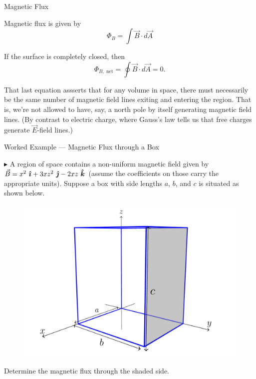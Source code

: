 \documentclass{beamer}
\begin{document}
\begin{frame}{Magnetic Flux}

Magnetic flux is given by
\begin{equation*}
    \Phi_B = \int \vec{B} \cdot d\vec{A}
\end{equation*}

\vfill

If the surface is completely closed, then
\begin{equation*}
    \Phi_{B, \text{ net}} = \oint \vec{B} \cdot d\vec{A} = 0.
\end{equation*}

That last equation assserts that for any volume in space, there must necessarily be the same number of magnetic field lines exiting and entering the region. That is, we're not allowed to have, say, a north pole by itself generating magnetic field lines. (By contrast to electric charge, where Gauss's law tells us that free charges generate $\vec{E}$-field lines.)

\end{frame}

\begin{frame}{Worked Example --- Magnetic Flux through a Box}

$\blacktriangleright$ A region of space contains a non-uniform magnetic field given by $\vec{B} = x^2\ \ihat + 3xz^2\ \jhat - 2xz\ \khat$ (assume the coefficients on those carry the appropriate units). Suppose a box with side lengths $a$, $b$, and $c$ is situated as shown below.

\begin{figure}[H]
\centering
\includegraphics[scale=0.16]{figures/box.png}
\end{figure}

Determine the magnetic flux through the shaded side.

\end{frame}
\end{document}

